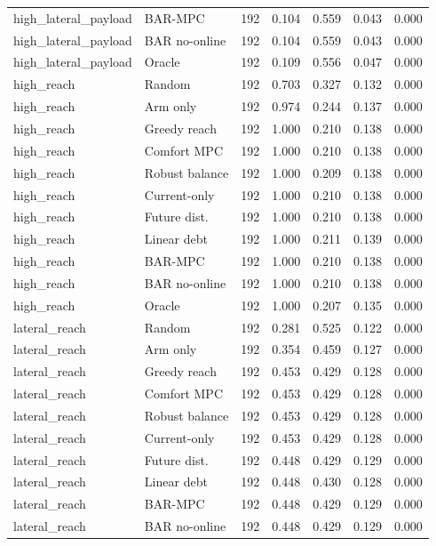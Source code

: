 \begin{longtable}{llrrrrr}
high\_lateral\_payload & BAR-MPC & 192 & 0.104 & 0.559 & 0.043 & 0.000 \\
high\_lateral\_payload & BAR no-online & 192 & 0.104 & 0.559 & 0.043 & 0.000 \\
high\_lateral\_payload & Oracle & 192 & 0.109 & 0.556 & 0.047 & 0.000 \\
high\_reach & Random & 192 & 0.703 & 0.327 & 0.132 & 0.000 \\
high\_reach & Arm only & 192 & 0.974 & 0.244 & 0.137 & 0.000 \\
high\_reach & Greedy reach & 192 & 1.000 & 0.210 & 0.138 & 0.000 \\
high\_reach & Comfort MPC & 192 & 1.000 & 0.210 & 0.138 & 0.000 \\
high\_reach & Robust balance & 192 & 1.000 & 0.209 & 0.138 & 0.000 \\
high\_reach & Current-only & 192 & 1.000 & 0.210 & 0.138 & 0.000 \\
high\_reach & Future dist. & 192 & 1.000 & 0.210 & 0.138 & 0.000 \\
high\_reach & Linear debt & 192 & 1.000 & 0.211 & 0.139 & 0.000 \\
high\_reach & BAR-MPC & 192 & 1.000 & 0.210 & 0.138 & 0.000 \\
high\_reach & BAR no-online & 192 & 1.000 & 0.210 & 0.138 & 0.000 \\
high\_reach & Oracle & 192 & 1.000 & 0.207 & 0.135 & 0.000 \\
lateral\_reach & Random & 192 & 0.281 & 0.525 & 0.122 & 0.000 \\
lateral\_reach & Arm only & 192 & 0.354 & 0.459 & 0.127 & 0.000 \\
lateral\_reach & Greedy reach & 192 & 0.453 & 0.429 & 0.128 & 0.000 \\
lateral\_reach & Comfort MPC & 192 & 0.453 & 0.429 & 0.128 & 0.000 \\
lateral\_reach & Robust balance & 192 & 0.453 & 0.429 & 0.128 & 0.000 \\
lateral\_reach & Current-only & 192 & 0.453 & 0.429 & 0.128 & 0.000 \\
lateral\_reach & Future dist. & 192 & 0.448 & 0.429 & 0.129 & 0.000 \\
lateral\_reach & Linear debt & 192 & 0.448 & 0.430 & 0.128 & 0.000 \\
lateral\_reach & BAR-MPC & 192 & 0.448 & 0.429 & 0.129 & 0.000 \\
lateral\_reach & BAR no-online & 192 & 0.448 & 0.429 & 0.129 & 0.000 \\

\end{longtable}
